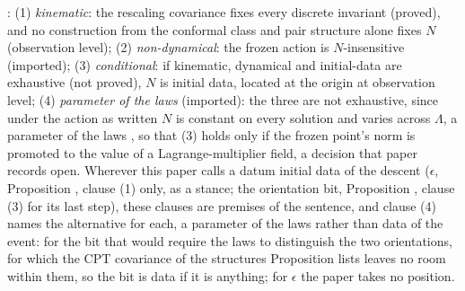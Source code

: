 \cite[Prop.~7.6]{ButlerT12}: (1) \emph{kinematic}: the rescaling covariance fixes every discrete invariant (proved), and no construction from the conformal class and pair structure alone fixes $N$ (observation level); (2) \emph{non-dynamical}: the frozen action is $N$-insensitive (imported); (3) \emph{conditional}: if kinematic, dynamical and initial-data are exhaustive (not proved), $N$ is initial data, located at the origin at observation level; (4) \emph{parameter of the laws} (imported): the three are not exhaustive, since under the action as written $N$ is constant on every solution and varies across $\Lambda$, a parameter of the laws \cite[Prop.~5.8]{ButlerT10}, so that (3) holds only if the frozen point's norm is promoted to the value of a Lagrange-multiplier field, a decision that paper records open. Wherever this paper calls a datum initial data of the descent ($\epsilon$, Proposition , clause (1) only, as a stance; the orientation bit, Proposition , clause (3) for its last step), these clauses are premises of the sentence, and clause (4) names the alternative for each, a parameter of the laws rather than data of the event: for the bit that would require the laws to distinguish the two orientations, for which the CPT covariance of the structures Proposition  lists leaves no room within them, so the bit is data if it is anything; for $\epsilon$ the paper takes no position.
